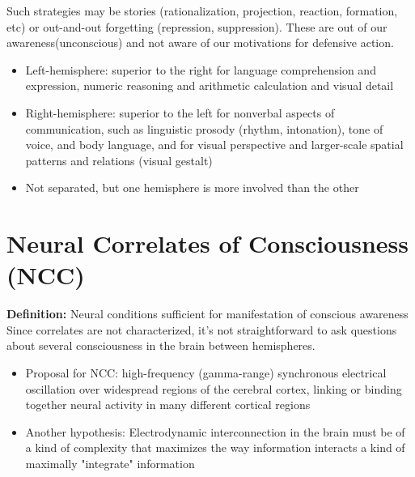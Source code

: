 \documentclass{article}
\begin{document}
Such strategies may be stories (rationalization, projection, reaction, formation, etc) or out-and-out forgetting (repression, suppression). These are out of our awareness(unconscious) and not aware of our motivations for defensive action. \\

\begin{itemize}
    \item Left-hemisphere: superior to the right for language comprehension and expression, numeric reasoning and arithmetic calculation and visual detail
    \item Right-hemisphere: superior to the left for nonverbal aspects of communication, such as linguistic prosody (rhythm, intonation), tone of voice, and body language, and for visual perspective and larger-scale spatial patterns and relations (visual gestalt)
    \item Not separated, but one hemisphere is more involved than the other
\end{itemize}

\section{Neural Correlates of Consciousness (NCC)}
\textbf{Definition:} Neural conditions sufficient for manifestation of conscious awareness \\

Since correlates are not characterized, it's not straightforward to ask questions about several consciousness in the brain between hemispheres. \\

\begin{itemize}
    \item Proposal for NCC: high-frequency (gamma-range) synchronous electrical oscillation over widespread regions of the cerebral cortex, linking or binding together neural activity in many different cortical regions
    \item Another hypothesis: Electrodynamic interconnection in the brain must be of a kind of complexity that maximizes the way information interacts a kind of maximally "integrate" information
\end{itemize}
\end{document}
